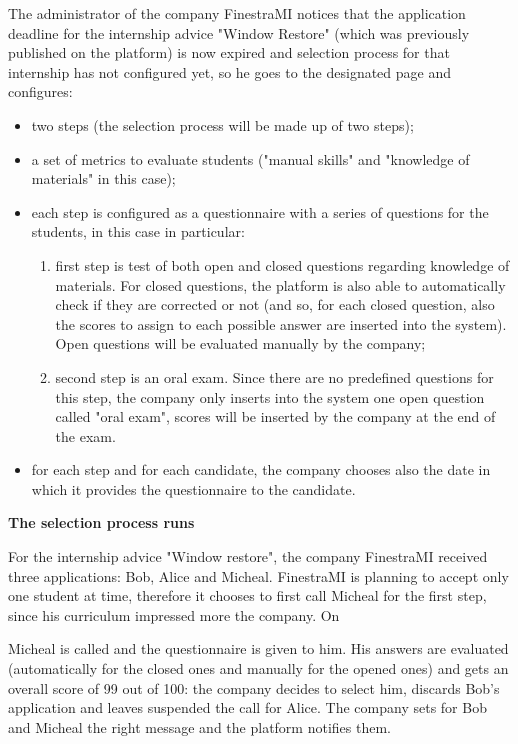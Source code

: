 			\begin{flushleft}
				The administrator of the company FinestraMI notices that the application deadline for the internship advice "Window Restore" (which was previously published on the platform) is now expired and selection process for that internship has not configured yet, so he goes to the designated page and configures:
				\begin{itemize}
					\item two steps (the selection process will be made up of two steps);
					\item a set of metrics to evaluate students ("manual skills" and "knowledge of materials" in this case);
					\item each step is configured as a questionnaire with a series of questions for the students, in this case in particular:
						\begin{enumerate}
							\item first step is test of both open and closed questions regarding knowledge of materials. For closed questions, the platform is also able to automatically check if they are corrected or not (and so, for each closed question, also the scores to assign to each possible answer are inserted into the system). Open questions will be evaluated manually by the company;
							\item second step is an oral exam. Since there are no predefined questions for this step, the company only inserts into the system one open question called "oral exam", scores will be inserted by the company at the end of the exam.
						\end{enumerate}
					\item for each step and for each candidate, the company chooses also the date in which it provides the questionnaire to the candidate.
				\end{itemize}
			\end{flushleft}
			\textbf{The selection process runs}
			\begin{flushleft}
				For the internship advice "Window restore", the company FinestraMI received three applications: Bob, Alice and Micheal. FinestraMI is planning to accept only one student at time, therefore it chooses to first call Micheal for the first step, since his curriculum impressed more the company. On \date{23/11/2024} Micheal is called and the questionnaire is given to him. His answers are evaluated (automatically for the closed ones and manually for the opened ones) and gets an overall score of 99 out of 100: the company decides to select him, discards Bob's application and leaves suspended the call for Alice. The company sets for Bob and Micheal the right message and the platform notifies them. 
			\end{flushleft}
